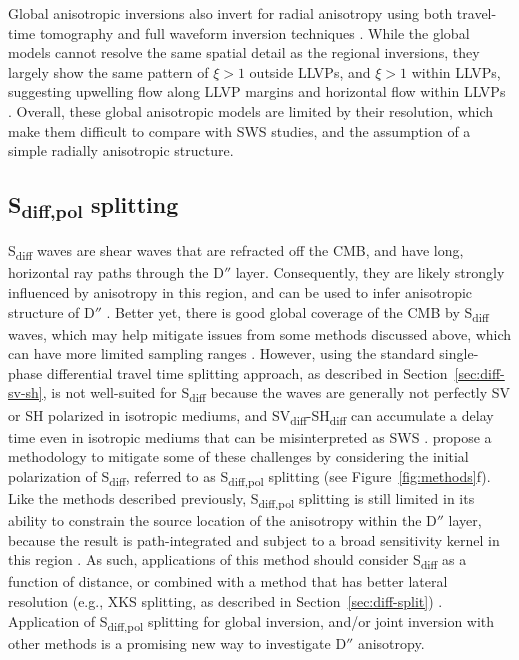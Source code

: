 \documentclass{standard}
\begin{document}
Global anisotropic inversions also invert for radial anisotropy using both travel-time tomography and full waveform inversion techniques \parencite{frenchWholemantleRadiallyAnisotropic2014}. While the global models cannot resolve the same spatial detail as the regional inversions, they largely show the same pattern of $\xi > 1$ outside LLVPs, and $\xi > 1$ within LLVPs, suggesting upwelling flow along LLVP margins and horizontal flow within LLVPs \parencite{wolfAdvancesMappingLowermost2024}. Overall, these global anisotropic models are limited by their resolution, which make them difficult to compare with SWS studies, and the assumption of a simple radially anisotropic structure.

\subsection{S\textsubscript{diff,pol} splitting}

S\textsubscript{diff} waves are shear waves that are refracted off the CMB, and have long, horizontal ray paths through the D$''$ layer. Consequently, they are likely strongly influenced by anisotropy in this region, and can be used to infer anisotropic structure of D$''$ \parencite{wolfMeasurementSdiffSplitting2023}. Better yet, there is good global coverage of the CMB by S\textsubscript{diff} waves, which may help mitigate issues from some methods discussed above, which can have more limited sampling ranges \parencite{laiTravelTimeWaveform2020}. However, using the standard single-phase differential travel time splitting approach, as described in Section~\ref{sec:diff-sv-sh}, is not well-suited for S\textsubscript{diff} because the waves are generally not perfectly SV or SH polarized in isotropic mediums, and SV\textsubscript{diff}-SH\textsubscript{diff} can accumulate a delay time even in isotropic mediums that can be misinterpreted as SWS \parencite{komatitschSHdiffSVdiffSplittingIsotropic2010}. \textcite{wolfMeasurementSdiffSplitting2023} propose a methodology to mitigate some of these challenges by considering the initial polarization of S\textsubscript{diff}, referred to as S\textsubscript{diff,pol} splitting (see Figure~\ref{fig:methods}f). Like the methods described previously, S\textsubscript{diff,pol} splitting is still limited in its ability to constrain the source location of the anisotropy within the D$''$ layer, because the result is path-integrated and subject to a broad sensitivity kernel in this region \parencite{wolfAdvancesMappingLowermost2024,favierSensitivityKernelsShear2003}. As such, applications of this method should consider S\textsubscript{diff} as a function of distance, or combined with a method that has better lateral resolution (e.g., XKS splitting, as described in Section~\ref{sec:diff-split}) \parencite{wolfAdvancesMappingLowermost2024,wolfMeasurementSdiffSplitting2023}. Application of S\textsubscript{diff,pol} splitting for global inversion, and/or joint inversion with other methods is a promising new way to investigate D$''$ anisotropy.
\end{document}
